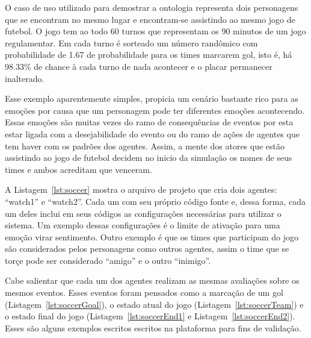O caso de uso utilizado para demostrar a ontologia representa dois personagens
que se encontram no mesmo lugar e encontram-se assistindo ao mesmo jogo de
futebol. O jogo tem ao todo 60 turnos que representam os 90 minutos de um jogo
regulamentar. Em cada turno é sorteado um número randômico com probabilidade
de 1.67 de probabilidade para os times marcarem gol, isto é, há 98.33\% de
chance à cada turno de nada acontecer e o placar permanecer inalterado.

Esse exemplo aparentemente simples, propicia um cenário bastante rico para as
emoções por causa que um personagem pode ter diferentes emoções acontecendo.
Essas emoções são muitas vezes do ramo de consequências de eventos por esta
estar ligada com a desejabilidade do evento ou do ramo de ações de agentes que
tem haver com os padrões dos agentes. Assim, a mente dos atores que estão
assistindo ao jogo de futebol decidem no inicio da simulação os nomes de seus
times e ambos acreditam que venceram.

\begin{center}
    \begin{minipage}{140mm}
	\lstset{linewidth=140mm}
	
    \end{minipage}
\end{center}

A Listagem~\ref{lst:soccer} mostra o arquivo de projeto que cria dois agentes:
``watch1'' e ``watch2''. Cada um com seu próprio código fonte e,
dessa forma, cada um deles inclui em seus códigos as configurações
necessárias para utilizar o sistema. Um exemplo dessas configurações
é o limite de ativação para uma emoção virar sentimento. Outro exemplo é que
os times que participam do jogo são considerados pelos personagens como outros
agentes, assim o time que se torçe pode ser considerado ``amigo'' e o outro
``inimigo''.

Cabe salientar que cada um dos agentes realizam as mesmas avaliações sobre os
mesmos eventos. Esses eventos foram pensados como a marcação de um gol
(Listagem~\ref{lst:soccerGoal}), o estado atual do jogo
(Listagem~\ref{lst:soccerTeam}) e  o estado final do jogo
(Listagem~\ref{lst:soccerEnd1} e Listagem~\ref{lst:soccerEnd2}).
Esses são alguns exemplos escritos escritos na plataforma \jason para
fins de validação.

